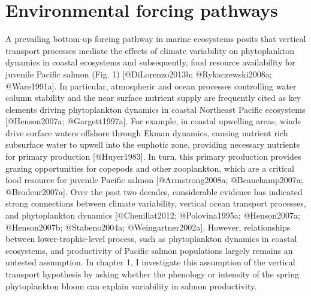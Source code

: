 \section{Environmental forcing
pathways}\label{environmental-forcing-pathways}

A prevailing bottom-up forcing pathway in marine ecosystems posits that
vertical transport processes mediate the effects of climate variability
on phytoplankton dynamics in coastal ecosystems and subsequently, food
resource availability for juvenile Pacific salmon (Fig. 1)
{[}@DiLorenzo2013b; @Rykaczewski2008a; @Ware1991a{]}. In particular,
atmospheric and ocean processes controlling water column stability and
the near surface nutrient supply are frequently cited as key elements
driving phytoplankton dynamics in coastal Northeast Pacific ecosystems
{[}@Henson2007a; @Gargett1997a{]}. For example, in coastal upwelling
areas, winds drive surface waters offshore through Ekman dynamics,
causing nutrient rich subsurface water to upwell into the euphotic zone,
providing necessary nutrients for primary production {[}@Huyer1983{]}.
In turn, this primary production provides grazing opportunities for
copepods and other zooplankton, which are a critical food resource for
juvenile Pacific salmon {[}@Armstrong2008a; @Beauchamp2007a;
@Brodeur2007a{]}. Over the past two decades, considerable evidence has
indicated strong connections between climate variability, vertical ocean
transport processes, and phytoplankton dynamics {[}@Chenillat2012;
@Polovina1995a; @Henson2007a; @Henson2007b; @Stabeno2004a;
@Weingartner2002a{]}. However, relationships between lower-trophic-level
process, such as phytoplankton dynamics in coastal ecosystems, and
productivity of Pacific salmon populations largely remains an untested
assumption. In chapter 1, I investigate this assumption of the vertical
transport hypothesis by asking whether the phenology or intensity of the
spring phytoplankton bloom can explain variability in salmon
productivity.

